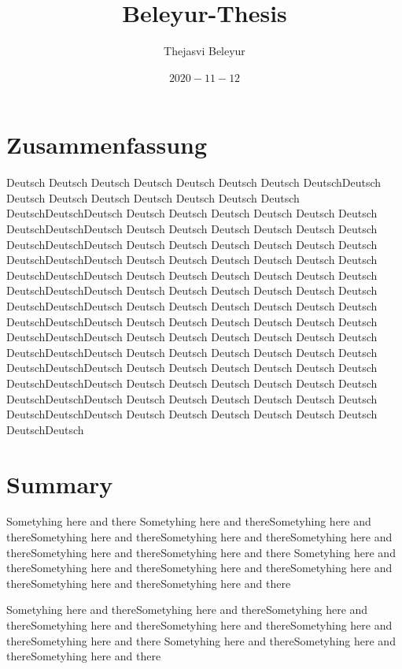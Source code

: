 \documentclass[
]{book}
\title{Beleyur-Thesis}
\author{Thejasvi Beleyur}
\date{\(2020-11-12\)}
\begin{document}
\maketitle

{
\setcounter{tocdepth}{1}
\tableofcontents
}
\hypertarget{zusammenf}{%
\chapter*{Zusammenfassung}\label{zusammenf}}

Deutsch Deutsch Deutsch Deutsch Deutsch Deutsch Deutsch DeutschDeutsch Deutsch Deutsch Deutsch Deutsch Deutsch Deutsch Deutsch DeutschDeutschDeutsch Deutsch Deutsch Deutsch Deutsch Deutsch Deutsch DeutschDeutschDeutsch Deutsch Deutsch Deutsch Deutsch Deutsch Deutsch DeutschDeutschDeutsch Deutsch Deutsch Deutsch Deutsch Deutsch Deutsch DeutschDeutschDeutsch Deutsch Deutsch Deutsch Deutsch Deutsch Deutsch DeutschDeutschDeutsch Deutsch Deutsch Deutsch Deutsch Deutsch Deutsch DeutschDeutschDeutsch Deutsch Deutsch Deutsch Deutsch Deutsch Deutsch DeutschDeutschDeutsch Deutsch Deutsch Deutsch Deutsch Deutsch Deutsch DeutschDeutschDeutsch Deutsch Deutsch Deutsch Deutsch Deutsch Deutsch DeutschDeutschDeutsch Deutsch Deutsch Deutsch Deutsch Deutsch Deutsch DeutschDeutschDeutsch Deutsch Deutsch Deutsch Deutsch Deutsch Deutsch DeutschDeutschDeutsch Deutsch Deutsch Deutsch Deutsch Deutsch Deutsch DeutschDeutschDeutsch Deutsch Deutsch Deutsch Deutsch Deutsch Deutsch DeutschDeutschDeutsch Deutsch Deutsch Deutsch Deutsch Deutsch Deutsch DeutschDeutschDeutsch Deutsch Deutsch Deutsch Deutsch Deutsch Deutsch DeutschDeutsch

\newpage

\hypertarget{summary}{%
\chapter*{Summary}\label{summary}}

Sometyhing here and there Sometyhing here and thereSometyhing here and thereSometyhing here and thereSometyhing here and thereSometyhing here and thereSometyhing here and thereSometyhing here and there
Sometyhing here and thereSometyhing here and thereSometyhing here and thereSometyhing here and thereSometyhing here and thereSometyhing here and there

Sometyhing here and thereSometyhing here and thereSometyhing here and thereSometyhing here and thereSometyhing here and thereSometyhing here and thereSometyhing here and there
Sometyhing here and thereSometyhing here and thereSometyhing here and there
\end{document}
